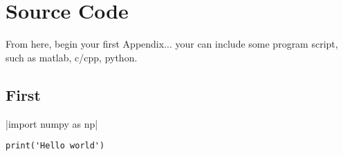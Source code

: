 \appendixpage
\appendix

\section{Source Code}

From here, begin your first Appendix... your can include some program
script, such as matlab, c/cpp, python.

\subsection{First}

|import numpy as np|

\begin{verbatim}
print('Hello world')
\end{verbatim}

\inputminted[linenos=true, frame=single]{python}{models/test.py}


    